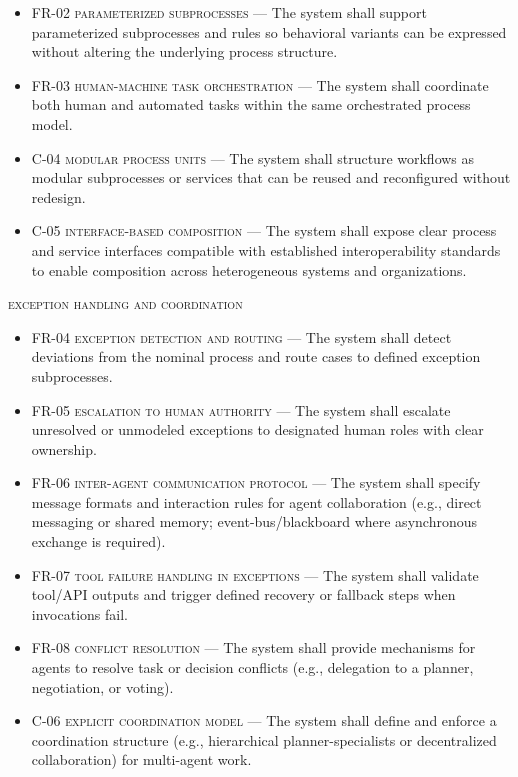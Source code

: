 \begin{footnotesize}
\begin{itemize}
      \item \textsc{FR-02 parameterized subprocesses} --- The system shall support parameterized subprocesses and rules so behavioral variants can be expressed without altering the underlying process structure.
      \item \textsc{FR-03 human-machine task orchestration} --- The system shall coordinate both human and automated tasks within the same orchestrated process model.
      \item \textsc{C-04 modular process units} --- The system shall structure workflows as modular subprocesses or services that can be reused and reconfigured without redesign.
      \item \textsc{C-05 interface-based composition} --- The system shall expose clear process and service interfaces compatible with established interoperability standards to enable composition across heterogeneous systems and organizations.
    \end{itemize}
  \textsc{exception handling and coordination}
    \begin{itemize}
      \item \textsc{FR-04 exception detection and routing} --- The system shall detect deviations from the nominal process and route cases to defined exception subprocesses.
      \item \textsc{FR-05 escalation to human authority} --- The system shall escalate unresolved or unmodeled exceptions to designated human roles with clear ownership.
      \item \textsc{FR-06 inter-agent communication protocol} --- The system shall specify message formats and interaction rules for agent collaboration (e.g., direct messaging or shared memory; event-bus/blackboard where asynchronous exchange is required).
      \item \textsc{FR-07 tool failure handling in exceptions} --- The system shall validate tool/API outputs and trigger defined recovery or fallback steps when invocations fail.
      \item \textsc{FR-08 conflict resolution} --- The system shall provide mechanisms for agents to resolve task or decision conflicts (e.g., delegation to a planner, negotiation, or voting).
      \item \textsc{C-06 explicit coordination model} --- The system shall define and enforce a coordination structure (e.g., hierarchical planner-specialists or decentralized collaboration) for multi-agent work.
    \end{itemize}

\end{footnotesize}
